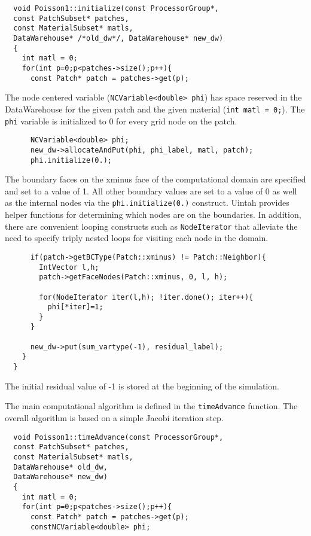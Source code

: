 \documentclass[11pt,fleqn]{book} %
\begin{document}
\begin{lstlisting}
  void Poisson1::initialize(const ProcessorGroup*,
  const PatchSubset* patches,
  const MaterialSubset* matls,
  DataWarehouse* /*old_dw*/, DataWarehouse* new_dw)
  {
    int matl = 0;
    for(int p=0;p<patches->size();p++){
      const Patch* patch = patches->get(p);

    \end{lstlisting}

    The node centered variable (\texttt{NCVariable<double> phi}) has space
    reserved in the DataWarehouse for the given patch and the given
    material (\texttt{int matl = 0;}).  The \texttt{phi} variable is
    initialized to 0 for every grid node on the patch.

    \begin{lstlisting}
      NCVariable<double> phi;
      new_dw->allocateAndPut(phi, phi_label, matl, patch);
      phi.initialize(0.);
    \end{lstlisting}

    The boundary faces on the xminus face of the computational domain are
    specified and set to a value of 1.  All other boundary values are set
    to a value of 0 as well as the internal nodes via the
    \texttt{phi.initialize(0.)} construct.  Uintah provides helper
    functions for determining which nodes are on the boundaries.  In
    addition, there are convenient looping constructs such as
    \texttt{NodeIterator} that alleviate the need to specify triply nested
    loops for visiting each node in the domain.

    \begin{lstlisting}
      if(patch->getBCType(Patch::xminus) != Patch::Neighbor){
        IntVector l,h;
        patch->getFaceNodes(Patch::xminus, 0, l, h);

        for(NodeIterator iter(l,h); !iter.done(); iter++){
          phi[*iter]=1;
        }
      }

      new_dw->put(sum_vartype(-1), residual_label);
    }
  }

\end{lstlisting}

The initial residual value of -1 is stored at the beginning of the
simulation.

The main computational algorithm is defined in the
\texttt{timeAdvance} function.  The overall algorithm is based on a
simple Jacobi iteration step.

\begin{lstlisting}
  void Poisson1::timeAdvance(const ProcessorGroup*,
  const PatchSubset* patches,
  const MaterialSubset* matls,
  DataWarehouse* old_dw,
  DataWarehouse* new_dw)
  {
    int matl = 0;
    for(int p=0;p<patches->size();p++){
      const Patch* patch = patches->get(p);
      constNCVariable<double> phi;

    \end{lstlisting}
\end{document}
